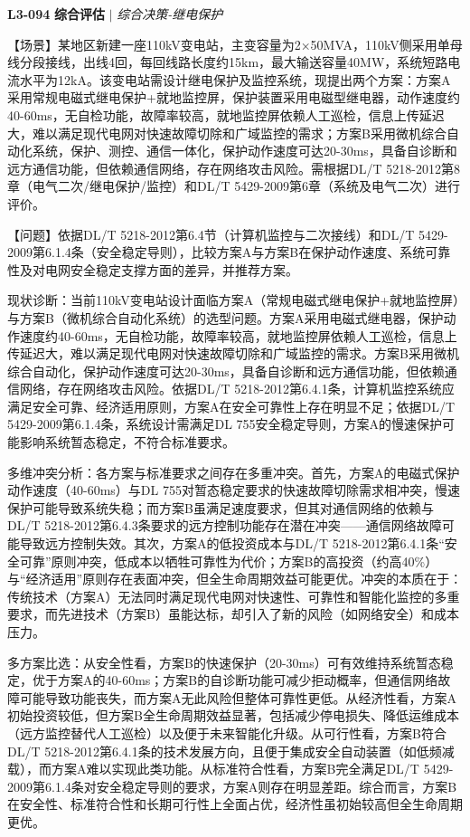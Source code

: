 \documentclass[11pt,a4paper]{ctexart}
\begin{document}
\noindent\textbf{L3-094} \hfill \textbf{综合评估} $|$ \textit{综合决策-继电保护}
\begin{description}[leftmargin=1.5em,style=nextline,font=\normalfont]
  \item[Q:] 【场景】某地区新建一座110kV变电站，主变容量为2×50MVA，110kV侧采用单母线分段接线，出线4回，每回线路长度约15km，最大输送容量40MW，系统短路电流水平为12kA。该变电站需设计继电保护及监控系统，现提出两个方案：方案A采用常规电磁式继电保护+就地监控屏，保护装置采用电磁型继电器，动作速度约40-60ms，无自检功能，故障率较高，就地监控屏依赖人工巡检，信息上传延迟大，难以满足现代电网对快速故障切除和广域监控的需求；方案B采用微机综合自动化系统，保护、测控、通信一体化，保护动作速度可达20-30ms，具备自诊断和远方通信功能，但依赖通信网络，存在网络攻击风险。需根据DL/T 5218-2012第8章（电气二次/继电保护/监控）和DL/T 5429-2009第6章（系统及电气二次）进行评价。

【问题】依据DL/T 5218-2012第6.4节（计算机监控与二次接线）和DL/T 5429-2009第6.1.4条（安全稳定导则），比较方案A与方案B在保护动作速度、系统可靠性及对电网安全稳定支撑方面的差异，并推荐方案。
  \item[A:] 现状诊断：当前110kV变电站设计面临方案A（常规电磁式继电保护+就地监控屏）与方案B（微机综合自动化系统）的选型问题。方案A采用电磁式继电器，保护动作速度约40-60ms，无自检功能，故障率较高，就地监控屏依赖人工巡检，信息上传延迟大，难以满足现代电网对快速故障切除和广域监控的需求。方案B采用微机综合自动化，保护动作速度可达20-30ms，具备自诊断和远方通信功能，但依赖通信网络，存在网络攻击风险。依据DL/T 5218-2012第6.4.1条，计算机监控系统应满足安全可靠、经济适用原则，方案A在安全可靠性上存在明显不足；依据DL/T 5429-2009第6.1.4条，系统设计需满足DL 755安全稳定导则，方案A的慢速保护可能影响系统暂态稳定，不符合标准要求。

多维冲突分析：各方案与标准要求之间存在多重冲突。首先，方案A的电磁式保护动作速度（40-60ms）与DL 755对暂态稳定要求的快速故障切除需求相冲突，慢速保护可能导致系统失稳；而方案B虽满足速度要求，但其对通信网络的依赖与DL/T 5218-2012第6.4.3条要求的远方控制功能存在潜在冲突——通信网络故障可能导致远方控制失效。其次，方案A的低投资成本与DL/T 5218-2012第6.4.1条“安全可靠”原则冲突，低成本以牺牲可靠性为代价；方案B的高投资（约高40\%）与“经济适用”原则存在表面冲突，但全生命周期效益可能更优。冲突的本质在于：传统技术（方案A）无法同时满足现代电网对快速性、可靠性和智能化监控的多重要求，而先进技术（方案B）虽能达标，却引入了新的风险（如网络安全）和成本压力。

多方案比选：从安全性看，方案B的快速保护（20-30ms）可有效维持系统暂态稳定，优于方案A的40-60ms；方案B的自诊断功能可减少拒动概率，但通信网络故障可能导致功能丧失，而方案A无此风险但整体可靠性更低。从经济性看，方案A初始投资较低，但方案B全生命周期效益显著，包括减少停电损失、降低运维成本（远方监控替代人工巡检）以及便于未来智能化升级。从可行性看，方案B符合DL/T 5218-2012第6.4.1条的技术发展方向，且便于集成安全自动装置（如低频减载），而方案A难以实现此类功能。从标准符合性看，方案B完全满足DL/T 5429-2009第6.1.4条对安全稳定导则的要求，方案A则存在明显差距。综合而言，方案B在安全性、标准符合性和长期可行性上全面占优，经济性虽初始较高但全生命周期更优。


\end{description}
\end{document}
